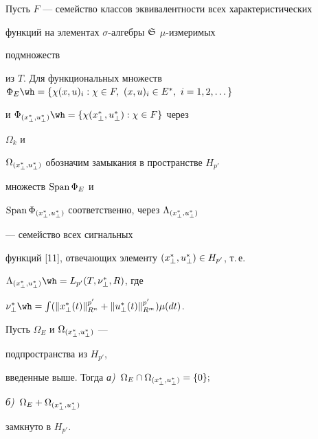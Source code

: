  


Пусть $F$ --- семейство классов эквивалентности всех характеристических 


функций на элементах $\sigma$-алгебры $\frak S$\; $\mu$-измеримых 


подмножеств 


из $T$. Для функциональных множеств $\Phi_E\wh =\{\chi(x,u)_i:\chi\in 


F,\ (x,u)_i\in E^*,\ i=1,2,\dotsc\}$ 


и $\Phi_{\myxu{\bot}}\wh =\{\chi\myxu{\bot}:\chi\in F\}$ через 


$\Omega_k$ и 


$\Omega_{{(x^*_{\bot},u^*_{\bot})}}$ обозначим замыкания в пространстве $H_{p'}$ 


множеств $\operatorname{Span}\Phi_E$ и 


$\operatorname{Span}\Phi_{{(x^*_{\bot},u^*_{\bot})}}$ соответственно, через $\Lambda_{{(x^*_{\bot},u^*_{\bot})}}$ 


--- семейство всех сигнальных 


функций [11], отвечающих элементу ${(x^*_{\bot},u^*_{\bot})}\in H_{p'}$, т.\,е. 


$\Lambda_{\myxu{\bot}}\wh =L_{p'}(T,\nu^*_\bot,R)$, где 


$\nu^*_\bot\wh=\int(\|x^*_\bot(t)\|^{p'}_{R^n}+ 


\|u^*_\bot(t)\|^{p'}_{R^m})\mu(dt)$. 


 


\begin{lem} 


Пусть $\Omega_E$ и $\Omega_{{(x^*_{\bot},u^*_{\bot})}}$ --- 


подпространства из $H_{p'}$, 


введенные выше. Тогда {\em а)}~$\Omega_E\cap\Omega_{{(x^*_{\bot},u^*_{\bot})}}=\{0\};$ 


{\em б)}~$\Omega_E+\Omega_{{(x^*_{\bot},u^*_{\bot})}}$ 


замкнуто в $H_{p'}$. 


\end{lem} 


 


